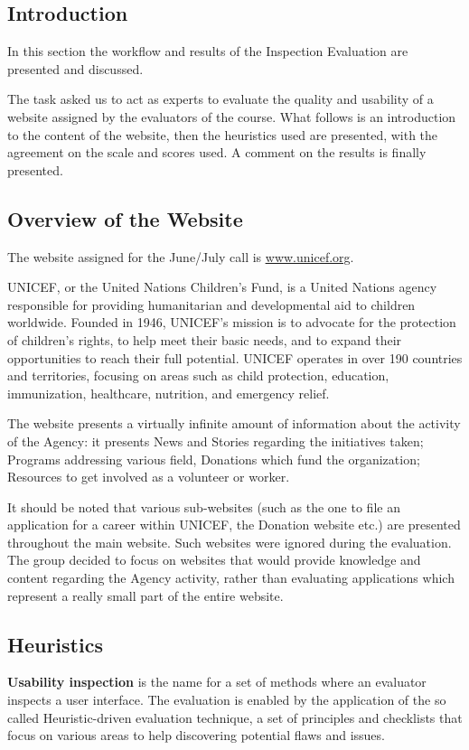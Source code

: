 \subsection{Introduction}
In this section the workflow and results of the Inspection Evaluation are presented and discussed.

The task asked us to act as experts to evaluate the quality and usability of a website assigned by the evaluators of the course. What follows is an introduction to the content of the website, then the heuristics used are presented, with the agreement on the scale and scores used. A comment on the results is finally presented.



\subsection{Overview of the Website}
The website assigned for the June/July call is \underline{\url{www.unicef.org}}.

UNICEF, or the United Nations Children’s Fund, is a United Nations agency responsible for providing humanitarian and developmental aid to children worldwide. Founded in 1946, UNICEF’s mission is to advocate for the protection of children’s rights, to help meet their basic needs, and to expand their opportunities to reach their full potential. UNICEF operates in over 190 countries and territories, focusing on areas such as child protection, education, immunization, healthcare, nutrition, and emergency relief.

The website presents a virtually infinite amount of information about the activity of the Agency: it presents News and Stories regarding the initiatives taken; Programs addressing various field, Donations which fund the organization; Resources to get involved as a volunteer or worker.

It should be noted that various sub-websites (such as the one to file an application for a career within UNICEF, the Donation website etc.) are presented throughout the main website. Such websites were ignored during the evaluation. The group decided to focus on websites that would provide knowledge and content regarding the Agency activity, rather than evaluating applications which represent a really small part of the entire website.

\subsection{Heuristics}
\textbf{Usability inspection} is the name for a set of methods where an evaluator inspects a user interface.
The evaluation is enabled by the application of the so called Heuristic-driven evaluation technique, a set of principles and checklists that focus on various areas to help discovering potential flaws and issues.


